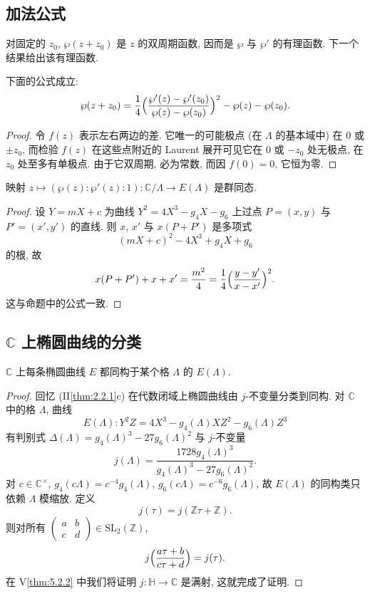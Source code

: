 \subsection*{加法公式}

对固定的 $z_0$, $\wp(z+z_0)$ 是 $z$ 的双周期函数, 因而是 $\wp$ 与 $\wp'$ 的有理函数. 下一个结果给出该有理函数.

\begin{proposition} \label{thm:3.3.8} 
下面的公式成立:
\[
\wp(z+z_0) = \frac{1}{4}\Bigl(\frac{\wp'(z) - \wp'(z_0)}{\wp(z) - \wp(z_0)}\Bigr)^2 - \wp(z) - \wp(z_0).
\]
\end{proposition}

\begin{proof}
令 $f(z)$ 表示左右两边的差. 它唯一的可能极点 (在 $\Lambda$ 的基本域中) 在 $0$ 或 $\pm z_0$, 而检验 $f(z)$ 在这些点附近的 Laurent 展开可见它在 $0$ 或 $-z_0$ 处无极点, 在 $z_0$ 处至多有单极点. 由于它双周期, 必为常数, 而因 $f(0) = 0$, 它恒为零.
\end{proof}

\begin{corollary} \label{thm:3.3.9} 
映射 $z\mapsto(\wp(z):\wp'(z):1)\colon\mathbb{C}/\Lambda\to E(\Lambda)$ 是群同态.
\end{corollary}

\begin{proof}
设 $Y = mX + c$ 为曲线 $Y^2 = 4X^3 - g_4X - g_6$ 上过点 $P = (x, y)$ 与 $P' = (x', y')$ 的直线. 则 $x$, $x'$ 与 $x(P+P')$ 是多项式
\[
(mX + c)^2 - 4X^3 + g_4X + g_6
\]
的根, 故
\[
x(P+P') + x + x' = \frac{m^2}{4} = \frac{1}{4}\Bigl(\frac{y - y'}{x - x'}\Bigr)^2.
\]
这与命题中的公式一致.
\end{proof}

\subsection*{$\mathbb{C}$ 上椭圆曲线的分类}

\begin{theorem} \label{thm:3.3.10} 
$\mathbb{C}$ 上每条椭圆曲线 $E$ 都同构于某个格 $\Lambda$ 的 $E(\Lambda)$.
\end{theorem}

\begin{proof}
回忆 (II\ref{thm:2.2.1}c) 在代数闭域上椭圆曲线由 $j$-不变量分类到同构. 对 $\mathbb{C}$ 中的格 $\Lambda$, 曲线
\[
E(\Lambda)\colon Y^2Z = 4X^3 - g_4(\Lambda)XZ^2 - g_6(\Lambda)Z^3
\]
有判别式 $\Delta(\Lambda) = g_4(\Lambda)^3 - 27g_6(\Lambda)^2$ 与 $j$-不变量
\[
j(\Lambda) = \frac{1728g_4(\Lambda)^3}{g_4(\Lambda)^3 - 27g_6(\Lambda)^2}.
\]
对 $c\in\mathbb{C}^{\times}$, $g_4(c\Lambda) = c^{-4}g_4(\Lambda)$, $g_6(c\Lambda) = c^{-6}g_6(\Lambda)$, 故 $E(\Lambda)$ 的同构类只依赖 $\Lambda$ 模缩放. 定义
\[
j(\tau) = j(\mathbb{Z}\tau + \mathbb{Z}).
\]
则对所有 $\begin{pmatrix}a & b\\ c & d\end{pmatrix}\in\mathrm{SL}_2(\mathbb{Z})$,
\[
j\Bigl(\frac{a\tau + b}{c\tau + d}\Bigr) = j(\tau).
\]
在 V\ref{thm:5.2.2} 中我们将证明 $j\colon\mathbb{H}\to\mathbb{C}$ 是满射, 这就完成了证明.
\end{proof}

